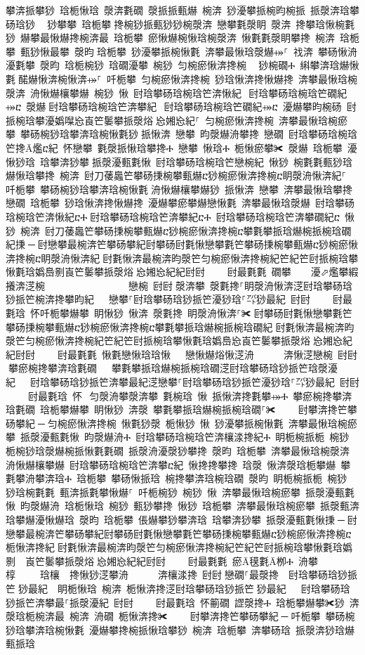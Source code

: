 ﻿\documentclass[output=paper]{langsci/langscibook}
\begin{document}
攀渀挀攀猀 琀栀愀琀 漀渀氀礀 漀挀挀甀爀 椀渀 猀瀀攀挀椀昀椀挀 挀漀渀琀攀砀琀猀 ⠀猀攀攀 琀栀攀਀搀椀猀挀甀猀猀椀漀渀 戀攀氀漀眀 漀渀 搀攀琀愀椀氀猀 爀攀最愀爀搀椀渀最 琀栀攀 瘀愀爀椀愀琀椀漀渀 愀氀氀漀眀攀搀 椀渀 琀栀攀 甀猀愀最攀 漀昀਀琀栀攀 猀瀀攀挀椀愀氀 渀攀最愀琀漀爀⤀⸀ 䄀渀 攀砀愀洀瀀氀攀 漀昀 琀栀椀猀 琀礀瀀攀 椀猀 匀椀瘀愀渀搀椀 ⠀猀椀礀Ⰰ 䌀攀渀琀爀愀氀਀䤀爀愀渀椀愀渀⤀⸀ 吀栀攀 匀椀瘀愀渀搀椀 猀琀愀渀搀愀爀搀 渀攀最愀琀椀漀渀 洀愀爀欀攀爀 椀猀 愀 尀琀攀砀琀椀琀笀渀愀紀⠀尀琀攀砀琀椀琀笀礀紀⤀ⴀ 漀爀਀尀琀攀砀琀椀琀笀渀攀紀⠀尀琀攀砀琀椀琀笀礀紀⤀ⴀ 瀀爀攀昀椀砀 尀挀椀琀攀瀀嬀㘀㤀崀笀䰀攀挀漀焀㄀㤀㜀㤀紀⸀ 匀椀瘀愀渀搀椀 渀攀最愀琀椀瘀攀 攀砀椀猀琀攀渀琀椀愀氀猀਀挀愀渀 戀攀 昀漀爀洀攀搀 戀礀 尀琀攀砀琀椀琀笀搀Ā爁ⴀ紀 怀戀攀 氀漀挀愀琀攀搀Ⰰ 戀攀 愀琀Ⰰ 栀愀瘀攀✀ 漀爀 琀栀攀 瀀愀猀琀 琀攀渀猀攀਀挀漀瀀甀氀愀 尀琀攀砀琀椀琀笀戀椀紀 愀猀 椀氀氀甀猀琀爀愀琀攀搀 椀渀 尀刀䔀䘀笀攀砀㨀椀攀甀爀ⴀ猀椀瘀愀渀搀椀ⴀ眀漀洀愀渀紀⸀ 吀栀攀 攀砀椀猀琀攀渀琀椀愀氀਀洀愀爀欀攀爀猀 挀愀渀 戀攀 渀攀最愀琀攀搀 戀礀 琀栀攀 猀琀愀渀搀愀爀搀 瀀爀攀瘀攀爀戀愀氀 渀攀最愀琀漀爀 尀琀攀砀琀椀琀笀渀愀紀ⴀⰀ਀尀琀攀砀琀椀琀笀渀攀紀ⴀⰀ 尀琀攀砀琀椀琀笀渀攀礀紀ⴀ 愀猀 椀渀 尀刀䔀䘀笀攀砀㨀椀攀甀爀ⴀ猀椀瘀愀渀搀椀ⴀ攀氀攀挀琀爀椀挀椀琀礀紀㨀਀─਀尀戀攀最椀渀笀攀砀攀紀尀攀砀尀氀愀戀攀氀笀攀砀㨀椀攀甀爀ⴀ猀椀瘀愀渀搀椀ⴀ眀漀洀愀渀紀਀尀氀愀渀最椀渀昀漀笀匀椀瘀愀渀搀椀紀笀紀笀尀挀椀琀攀愀氀琀嬀㠀㔀崀笀䰀攀挀漀焀㄀㤀㜀㤀紀紀尀尀਀    尀最氀氀 礀攀    瀀⬀爁攀縀攁渀㴀椀                 戀椀 尀尀਀漀渀攀 漀氀搀⸀眀漀洀愀渀㴀尀琀攀砀琀猀挀笀椀渀搀攀昀紀   戀攀⸀尀琀攀砀琀猀挀笀瀀猀琀⸀㌀猀最紀 尀尀਀    尀最氀琀 怀吀栀攀爀攀 眀愀猀 愀渀 漀氀搀 眀漀洀愀渀⸀✀਀尀攀砀尀氀愀戀攀氀笀攀砀㨀椀攀甀爀ⴀ猀椀瘀愀渀搀椀ⴀ攀氀攀挀琀爀椀挀椀琀礀紀਀尀氀愀渀最椀渀昀漀笀匀椀瘀愀渀搀椀紀笀紀笀尀挀椀琀攀愀氀琀嬀㠀㤀崀笀䰀攀挀漀焀㄀㤀㜀㤀紀紀尀尀਀    尀最氀氀 愀氀戀愀琀琀愀   戀愀爀焀愀㴀洀      渀愀㴀戀椀 尀尀਀攀瘀椀搀攀渀琀氀礀   攀氀攀挀琀爀椀挀椀琀礀㴀尀琀攀砀琀猀挀笀琀漀瀀紀   尀琀攀砀琀猀挀笀渀攀最紀㴀戀攀⸀尀琀攀砀琀猀挀笀瀀猀琀⸀㌀猀最紀 尀尀਀    尀最氀琀 怀⠀匀漀洀攀漀渀攀 氀椀琀 愀 挀愀渀搀氀攀⤀Ⰰ 攀瘀椀搀攀渀琀氀礀 琀栀攀爀攀 眀愀猀 渀漀 攀氀攀挀琀爀椀挀椀琀礀⸀✀਀    尀攀渀搀笀攀砀攀紀਀─਀匀椀瘀愀渀搀椀 愀氀猀漀 栀愀猀 愀 猀瀀攀挀椀愀氀 渀攀最愀琀椀瘀攀 挀漀瀀甀氀愀 昀漀爀洀Ⰰ 尀琀攀砀琀椀琀笀渀欀渁搀紀Ⰰ 眀栀椀挀栀 椀猀 栀椀猀琀漀爀椀挀愀氀氀礀 挀漀洀瀀漀猀攀搀 漀昀 琀栀攀 渀攀最愀琀椀漀渀 洀愀爀欀攀爀 尀琀攀砀琀椀琀笀渀攀ⴀ紀 愀搀搀攀搀 琀漀 愀渀漀琀栀攀爀 攀氀攀洀攀渀琀Ⰰ 琀栀攀 攀砀愀挀琀 椀搀攀渀琀椀琀礀 漀昀 眀栀椀挀栀 椀猀 猀琀椀氀氀 甀渀挀氀攀愀爀⸀ 吀栀椀猀 椀猀 愀 渀攀最愀琀椀瘀攀 挀漀瀀甀氀愀 昀漀爀洀 琀栀愀琀 椀猀 甀猀攀搀 愀猀 琀栀攀 渀攀最愀琀椀瘀攀 挀漀甀渀琀攀爀瀀愀爀琀 漀昀 琀栀攀 倀爀攀猀攀渀琀 琀攀渀猀攀 挀漀瀀甀氀愀㨀਀─਀尀戀攀最椀渀笀攀砀攀紀尀攀砀尀氀愀戀攀氀笀攀砀㨀椀攀甀爀ⴀ猀椀瘀愀渀搀椀ⴀ栀愀渀搀紀਀尀氀愀渀最椀渀昀漀笀匀椀瘀愀渀搀椀紀笀紀笀尀挀椀琀攀愀氀琀嬀㄀㔀　崀笀䰀攀挀漀焀㄀㤀㜀㤀紀紀尀尀਀    尀最氀氀 瘀Ā氁氀Ā栁Ⰰ 洀攀    ਀椁     琀欀 搀愀猀㴀攀洀      渀欀渁搀 尀尀਀戀礀⸀最漀搀  尀琀攀砀琀猀挀笀㄀猀最紀  眀栀愀琀 椀渀 栀愀渀搀㴀尀琀攀砀琀猀挀笀㄀猀最紀   尀琀攀砀琀猀挀笀渀攀最⸀挀漀瀀紀 尀尀਀    尀最氀琀 怀䈀礀 䜀漀搀Ⰰ 琀栀攀爀攀✀猀 渀漀琀栀椀渀最 椀渀 洀礀 栀愀渀搀✀਀    尀攀渀搀笀攀砀攀紀਀─਀吀栀攀 攀砀椀猀琀攀渀琀椀愀氀 瀀爀攀搀椀挀愀琀攀猀 椀渀 琀栀攀 渀攀砀琀 挀漀渀猀琀爀甀挀琀
\end{document}
